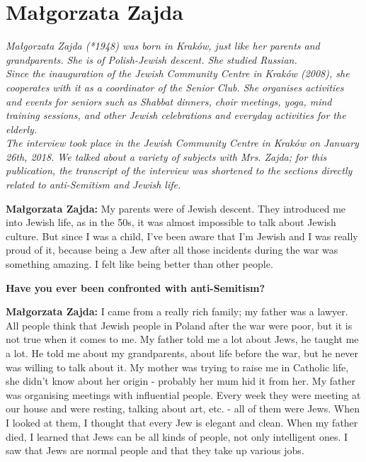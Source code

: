 \section{Małgorzata Zajda}

\textit{Małgorzata Zajda (*1948) was born in Kraków, just like her parents and grandparents. She is of Polish-Jewish descent. She studied Russian.\\
Since the inauguration of the Jewish Community Centre in Kraków (2008), she cooperates with it as a coordinator of the Senior Club. She organises activities and events for seniors such as Shabbat dinners, choir meetings, yoga, mind training sessions, and other Jewish celebrations and everyday activities for the elderly.\\
The interview took place in the Jewish Community Centre in Kraków on January 26th, 2018. We talked about a variety of subjects with Mrs. Zajda; for this publication, the transcript of the interview was shortened to the sections directly related to anti-Semitism and Jewish life. }\par 
\vspace*{2em}
\textbf{Małgorzata Zajda:} My parents were of Jewish descent. They introduced me into Jewish life, as in the 50s, it was almost impossible to talk about Jewish culture. But since I was a child, I've been aware that I'm Jewish and I was really proud of it, because being a Jew after all those incidents during the war was something amazing. I felt like being better than other people.  

\textbf{Have you ever been confronted with anti-Semitism?} 

\textbf{Małgorzata Zajda:} I came from a really rich family; my father was a lawyer. All people think that Jewish people in Poland after the war were poor, but it is not true when it comes to me. My father told me a lot about Jews, he taught me a lot. He told me about my grandparents, about life before the war, but he never was willing to talk about it. My mother was trying to raise me in Catholic life, she didn't know about her origin - probably her mum hid it from her. My father was organising meetings with influential people. Every week they were meeting at our house and were resting, talking about art, etc. - all of them were Jews. When I looked at them, I thought that every Jew is elegant and clean. When my father died, I learned that Jews can be all kinds of people, not only intelligent ones. I saw that Jews are normal people and that they take up various jobs. 

